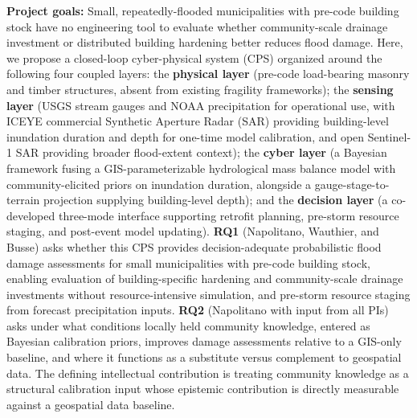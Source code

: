 \documentclass[11pt]{article}
\begin{document}
\setlength{\baselineskip}{12.6pt}
\setlength{\normalbaselineskip}{12.6pt}


\begin{tcolorbox}[colback=mycmykcolor, colframe=black, boxrule=1pt, coltext=black]
\textbf{Project goals:}
Small, repeatedly-flooded municipalities with pre-code building stock have no
engineering tool to evaluate whether community-scale drainage investment or distributed
building hardening better reduces flood damage.
Here, we propose a closed-loop cyber-physical system (CPS) organized around the following four coupled layers:
the \textbf{physical layer} (pre-code load-bearing masonry and timber structures,
absent from existing fragility frameworks);
the \textbf{sensing layer} (USGS stream gauges and NOAA precipitation for operational
use, with ICEYE commercial Synthetic Aperture Radar (SAR) providing building-level inundation duration and depth for one-time model calibration, and open Sentinel-1 SAR providing broader flood-extent context);
the \textbf{cyber layer} (a Bayesian framework fusing a GIS-parameterizable hydrological
mass balance model with community-elicited priors on inundation duration, alongside a
gauge-stage-to-terrain projection supplying building-level depth); and
the \textbf{decision layer} (a co-developed three-mode interface supporting retrofit
planning, pre-storm resource staging, and post-event model updating).
\textbf{RQ1} (Napolitano, Wauthier, and Busse) asks whether this CPS provides
decision-adequate probabilistic flood damage assessments for small municipalities
with pre-code building stock, enabling evaluation of building-specific hardening
and community-scale drainage investments without resource-intensive simulation,
and pre-storm resource staging from forecast precipitation inputs.
\textbf{RQ2} (Napolitano with input from all PIs) asks under what conditions locally held
community knowledge, entered as Bayesian calibration priors, improves damage
assessments relative to a GIS-only baseline, and where it functions as a substitute
versus complement to geospatial data.
The defining intellectual contribution is treating community knowledge as a structural
calibration input whose epistemic contribution is directly measurable against a
geospatial data baseline.
\end{tcolorbox}
\vspace{-0.5cm}
\end{document}
